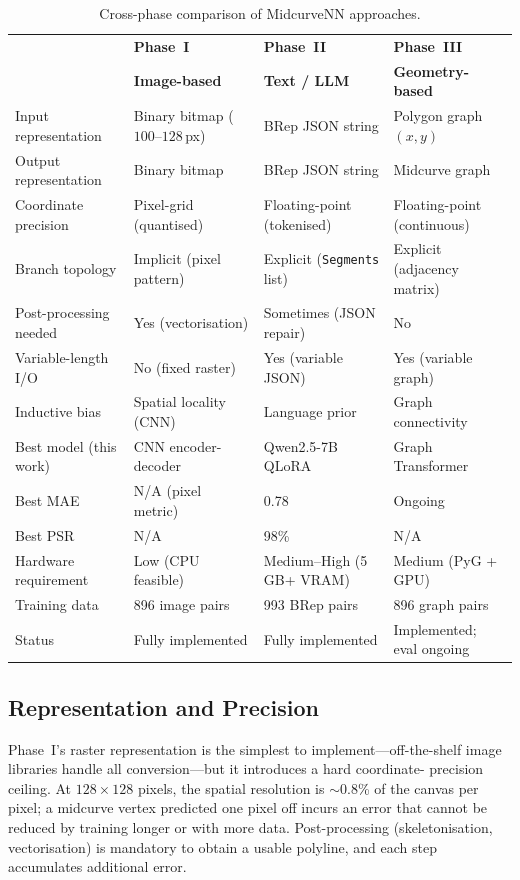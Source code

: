 \documentclass[journal]{IEEEtran}
\begin{document}
\begin{table}[!t]
\centering
\caption{Cross-phase comparison of MidcurveNN approaches.}
\label{tab:phase_comparison}
\begin{tabular}{@{}p{2.8cm}p{3.2cm}p{3.2cm}p{3.5cm}@{}}
\toprule
 & \textbf{Phase~I} & \textbf{Phase~II} & \textbf{Phase~III} \\
 & \textbf{Image-based} & \textbf{Text / LLM} & \textbf{Geometry-based} \\
\midrule
Input representation  & Binary bitmap ($100$--$128$\,px) & BRep JSON string & Polygon graph $(x,y)$ \\
Output representation & Binary bitmap & BRep JSON string & Midcurve graph \\
Coordinate precision  & Pixel-grid (quantised) & Floating-point (tokenised) & Floating-point (continuous) \\
Branch topology       & Implicit (pixel pattern) & Explicit (\texttt{Segments} list) & Explicit (adjacency matrix) \\
Post-processing needed & Yes (vectorisation) & Sometimes (JSON repair) & No \\
Variable-length I/O   & No (fixed raster) & Yes (variable JSON) & Yes (variable graph) \\
Inductive bias        & Spatial locality (CNN) & Language prior & Graph connectivity \\
Best model (this work)& CNN encoder-decoder & Qwen2.5-7B QLoRA & Graph Transformer \\
Best MAE              & N/A (pixel metric) & 0.78 & Ongoing \\
Best PSR              & N/A & 98\% & N/A \\
Hardware requirement  & Low (CPU feasible) & Medium--High (5\,GB+ VRAM) & Medium (PyG + GPU) \\
Training data         & 896 image pairs & 993 BRep pairs & 896 graph pairs \\
Status                & Fully implemented & Fully implemented & Implemented; eval ongoing \\
\bottomrule
\end{tabular}
\end{table}

\subsection{Representation and Precision}

Phase~I's raster representation is the simplest to implement—off-the-shelf
image libraries handle all conversion—but it introduces a hard coordinate-
precision ceiling.  At $128 \times 128$ pixels, the spatial resolution is
$\sim$0.8\% of the canvas per pixel; a midcurve vertex predicted one pixel
off incurs an error that cannot be reduced by training longer or with more
data.  Post-processing (skeletonisation, vectorisation) is mandatory to obtain
a usable polyline, and each step accumulates additional error.
\end{document}
